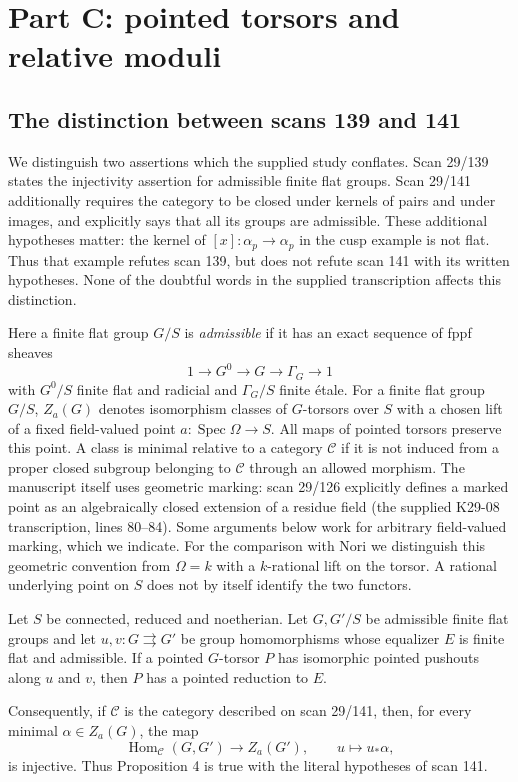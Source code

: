 \section{Part C: pointed torsors and relative moduli}
\label{sec:part-C}

\subsection{The distinction between scans 139 and 141}

We distinguish two assertions which the supplied study conflates.  Scan
29/139 states the injectivity assertion for admissible finite flat groups.
Scan 29/141 additionally requires the category to be closed under kernels
of pairs and under images, and explicitly says that all its groups are
admissible.  These additional hypotheses matter: the kernel of
$[x]\colon\alpha_p\to\alpha_p$ in the cusp example is not flat.  Thus that
example refutes scan 139, but does not refute scan 141 with its written
hypotheses.  None of the doubtful words in the supplied transcription
affects this distinction.

Here a finite flat group $G/S$ is \emph{admissible} if it has an exact
sequence of fppf sheaves
\[
1\longrightarrow G^0\longrightarrow G\longrightarrow\Gamma_G
\longrightarrow1
\]
with $G^0/S$ finite flat and radicial and $\Gamma_G/S$ finite \'etale.
For a finite flat group $G/S$, $Z_a(G)$ denotes isomorphism classes of
$G$-torsors over $S$ with a chosen lift of a fixed field-valued point
$a\colon\operatorname{Spec}\Omega\to S$.
All maps of pointed torsors preserve this point.  A class is minimal
relative to a category $\mathcal C$ if it is not induced from a proper
closed subgroup belonging to $\mathcal C$ through an allowed morphism.
The manuscript itself uses geometric marking: scan 29/126 explicitly
defines a marked point as an algebraically closed extension of a
residue field (the supplied K29-08 transcription, lines 80--84).
Some arguments below work for arbitrary field-valued marking, which
we indicate.  For the comparison with Nori we distinguish this
geometric convention from $\Omega=k$ with a $k$-rational lift on the
torsor.  A rational underlying point on $S$ does not by itself identify
the two functors.

\begin{theorem}
\label{C:literal-141}
Let $S$ be connected, reduced and noetherian.  Let $G,G'/S$ be admissible
finite flat groups and let $u,v\colon G\rightrightarrows G'$ be group
homomorphisms whose equalizer $E$ is finite flat and admissible.  If a
pointed $G$-torsor $P$ has isomorphic pointed pushouts along $u$ and $v$,
then $P$ has a pointed reduction to $E$.

Consequently, if $\mathcal C$ is the category described on scan 29/141,
then, for every minimal $\alpha\in Z_a(G)$, the map
\[
\operatorname{Hom}_{\mathcal C}(G,G')\longrightarrow Z_a(G'),
\qquad u\longmapsto u_*\alpha,
\]
is injective.  Thus Proposition 4 is true with the literal hypotheses of
scan 141.
\end{theorem}

